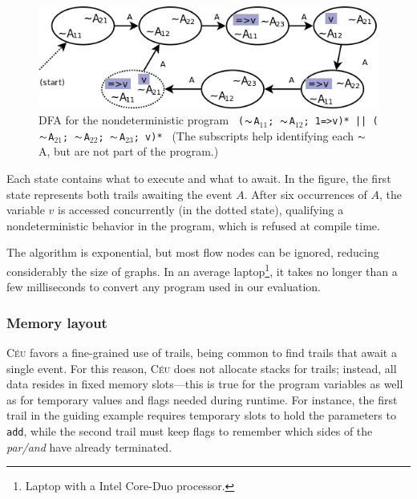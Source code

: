 \documentclass{sig-alternate-ipsn09}
\newcommand{\2}{\;\;}
\newcommand{\5}{\;\;\;\;\;}
\newcommand{\til}{$\thicksim$}
\newcommand{\CEU}{\textsc{C\'{e}u}}
\newcommand{\code}[1] {{\small{\texttt{#1}}}}
\begin{document}

\begin{figure}[ht]
\centering
\caption{ DFA for the nondeterministic program
\code{
    (\til{}A$_{11}$; \til{}A$_{12}$; 1=>v)* ||
    (\til{}A$_{21}$; \til{}A$_{22}$; \til{}A$_{23}$; v)*
}
\tiny{
    (The subscripts help identifying each \til{}A, but are not part of the 
program.)
}
}

\label{fig:dfa_02}
\includegraphics[scale=0.30]{dfa_02.png}
\end{figure}

Each state contains what to execute and what to await.
In the figure, the first state represents both trails awaiting the event $A$.
After six occurrences of $A$, the variable $v$ is accessed concurrently (in the 
dotted state), qualifying a nondeterministic behavior in the program, which is 
refused at compile time.

The algorithm is exponential, but most flow nodes can be ignored, reducing 
considerably the size of graphs.
In an average laptop\footnote{Laptop with a Intel Core-Duo processor.}, it 
takes no longer than a few milliseconds to convert any program used in our 
evaluation.

\subsubsection{Memory layout}

\CEU{} favors a fine-grained use of trails, being common to find trails that 
await a single event.
For this reason, \CEU{} does not allocate stacks for trails; instead, all data 
resides in fixed memory slots---this is true for the program variables as well 
as for temporary values and flags needed during runtime.
For instance, the first trail in the guiding example requires temporary slots 
to hold the parameters to \code{add}, while the second trail must keep flags to 
remember which sides of the \emph{par/and} have already terminated.
\end{document}
